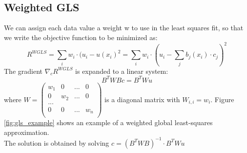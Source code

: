\subsection{Weighted GLS}
We can assign each data value a weight w to use in the least squares fit, so that we write the objective function to be minimized as:
\begin{equation}
	R^{WGLS} = \sum_i{w_i \cdot (u_i - u(x_i)^2} = \sum_i{w_i \cdot (u_i - \sum_j{b_j(x_i)\cdot c_j})^2}
\end{equation}
The gradient $\nabla_c R^{WGLS}$ is expanded to a linear system:
\begin{equation}
	B^TWBc = B^TWu
\end{equation}
where $W = 
\begin{pmatrix}
	w_1 & 0 	& ... & 0\\
	0 	& w_2 	& ... & 0\\
	...\\
	0 	& 0 	& ... & w_n\\
\end{pmatrix}$ is a diagonal matrix with $W_{i,i} = w_i$. Figure \ref{fig:gls_example} shows an example of a weighted global least-squares approximation.\\
The solution is obtained by solving $c = (B^TWB)^{-1}\cdot B^TWu$
